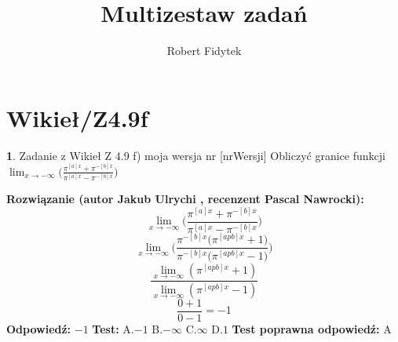 \documentclass[12pt, a4paper]{article}
\title{Multizestaw zadań}
\author{Robert Fidytek}
\date{}
\theoremstyle{definition} %
\newtheorem{zad}{}
\newcommand{\kategoria}[1]{\section{#1}} %
\newcommand{\zadStart}[1]{\begin{zad}#1\newline} %
\newcommand{\zadStop}{\end{zad}}   %
\newcommand{\rozwStart}[2]{\noindent \textbf{Rozwiązanie (autor #1 , recenzent #2): }\newline} %
\newcommand{\odpStart}{\noindent \textbf{Odpowiedź:}\newline}    %
\newcommand{\odpStop}{\newline}                                             %
\newcommand{\testStart}{\noindent \textbf{Test:}\newline} %
\newcommand{\testStop}{\newline} %
\newcommand{\kluczStart}{\noindent \textbf{Test poprawna odpowiedź:}\newline} %
\newcommand{\kluczStop}{\newline} %
\begin{document}
\maketitle


\kategoria{Wikieł/Z4.9f}
\zadStart{Zadanie z Wikieł Z 4.9 f) moja wersja nr [nrWersji]}
Obliczyć granice funkcji $\lim_{x \to -\infty}\bigg(\frac{\pi^{[a]x}+\pi^{-[b]x}}{\pi^{[a]x}-\pi^{-[b]x}}\bigg)$
\zadStop
\rozwStart{Jakub Ulrychi}{Pascal Nawrocki}
$$\lim_{x \to -\infty}\bigg(\frac{\pi^{[a]x}+\pi^{-[b]x}}{\pi^{[a]x}-\pi^{-[b]x}}\bigg)$$
$$\lim_{x \to -\infty}\bigg(\frac{\pi^{-[b]x}\big(\pi^{[apb]x}+1\big)}{\pi^{-[b]x}\big(\pi^{[apb]x}-1\big)}\bigg)$$
$$\frac{\lim_{x \to -\infty}(\pi^{[apb]x}+1)}{\lim_{x \to -\infty}(\pi^{[apb]x}-1)}$$
$$\frac{0+1}{0-1}=-1$$
\odpStart
$-1$
\odpStop
\testStart
A.$-1$
B.$-\infty$
C.$\infty$
D.$1$
\testStop
\kluczStart
A
\kluczStop
\end{document}
